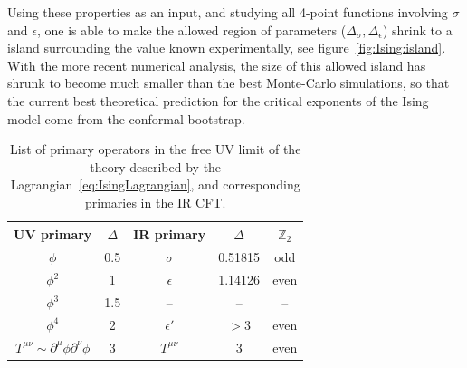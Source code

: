 \documentclass[a4paper,12pt]{article}
\numberwithin{equation}{section}
\begin{document}
%
Using these properties as an input, and studying all 4-point functions involving $\sigma$ and $\epsilon$, one is able to make the allowed region of parameters ($\Delta_\sigma, \Delta_\epsilon$) shrink to a island surrounding the value known experimentally, see figure~\ref{fig:Ising:island}. With the more recent numerical analysis, the size of this allowed island has shrunk to become much smaller than the best Monte-Carlo simulations, so that the current best theoretical prediction for the critical exponents of the Ising model come from the conformal bootstrap.

\begin{table}
	\centering
	\begin{tabular}{|c|c||c|c||c|}
		\hline
		UV primary & $\Delta$ & IR primary
		& $\Delta$ & $\mathbb{Z}_2$
		\\ \hline
		$\phi$ & 0.5 & $\sigma$ & 0.51815 & odd
		\\
		$\phi^2$ & 1 & $\epsilon$ & 1.14126 & even
		\\
		$\phi^3$ & 1.5 & -- & -- & --
		\\
		$\phi^4$ & 2 & $\epsilon'$ & $> 3$ & even
		\\
		\hline
		$T^{\mu\nu} \sim \partial^\mu \phi \partial^\nu \phi$ & 3 &
		$T^{\mu\nu}$ & 3 & even
		\\
		\hline
	\end{tabular}
	\caption{List of primary operators in the free UV limit of the
	theory described by the Lagrangian~\eqref{eq:IsingLagrangian},
	and corresponding primaries in the IR CFT.}
	\label{tab:Isingops}
\end{table}
\end{document}
